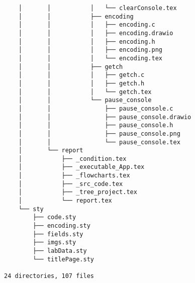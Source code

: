 \begin{verbatim}
    │       │           │   └── clearConsole.tex
    │       │           ├── encoding
    │       │           │   ├── encoding.c
    │       │           │   ├── encoding.drawio
    │       │           │   ├── encoding.h
    │       │           │   ├── encoding.png
    │       │           │   └── encoding.tex
    │       │           ├── getch
    │       │           │   ├── getch.c
    │       │           │   ├── getch.h
    │       │           │   └── getch.tex
    │       │           └── pause_console
    │       │               ├── pause_console.c
    │       │               ├── pause_console.drawio
    │       │               ├── pause_console.h
    │       │               ├── pause_console.png
    │       │               └── pause_console.tex
    │       └── report
    │           ├── _condition.tex
    │           ├── _executable_App.tex
    │           ├── _flowcharts.tex
    │           ├── _src_code.tex
    │           ├── _tree_project.tex
    │           └── report.tex
    └── sty
        ├── code.sty
        ├── encoding.sty
        ├── fields.sty
        ├── imgs.sty
        ├── labData.sty
        └── titlePage.sty

24 directories, 107 files
\end{verbatim}